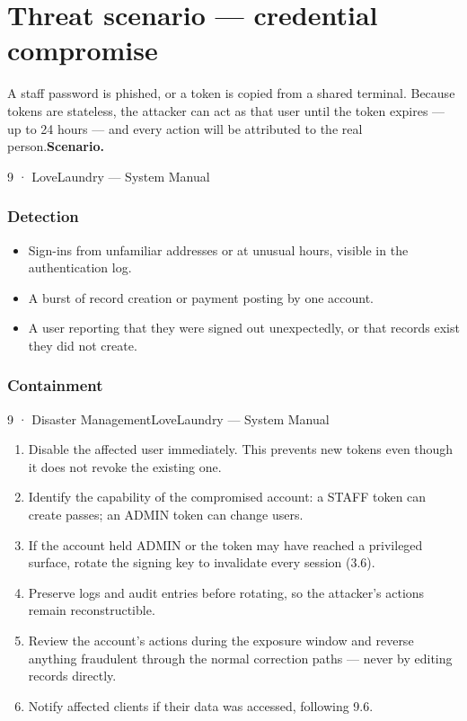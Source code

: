 \documentclass[11pt,a4paper,oneside]{book}
\begin{document}
\section*{Threat scenario — credential compromise}
A staff password is phished, or a token is copied from a shared terminal. Because tokens are stateless, the attacker can act as that user until the token expires — up to 24 hours — and every action will be attributed to the real person.\textbf{Scenario.}

9 · LoveLaundry — System Manual

\subsubsection*{Detection}
\begin{itemize}
\item Sign-ins from unfamiliar addresses or at unusual hours, visible in the authentication log.
\item A burst of record creation or payment posting by one account.
\item A user reporting that they were signed out unexpectedly, or that records exist they did not create.
\end{itemize}
\subsubsection*{Containment}
9 · Disaster ManagementLoveLaundry — System Manual

\begin{enumerate}
\item Disable the affected user immediately. This prevents new tokens even though it does not revoke the existing one.
\item Identify the capability of the compromised account: a STAFF token can create passes; an ADMIN token can change users.
\item If the account held ADMIN or the token may have reached a privileged surface, rotate the signing key to invalidate every session (3.6).
\item Preserve logs and audit entries before rotating, so the attacker's actions remain reconstructible.
\item Review the account's actions during the exposure window and reverse anything fraudulent through the normal correction paths — never by editing records directly.
\item Notify affected clients if their data was accessed, following 9.6.
\end{enumerate}
\end{document}
